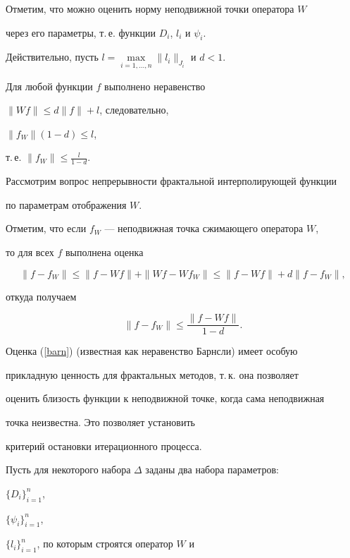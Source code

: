 Отметим, что можно оценить норму неподвижной точки оператора $W$


через его параметры, т.\,е. функции $D_i$, $l_i$ и $\psi_i$.


Действительно, пусть $l=\max\limits_{i=1,\dotsc,n}


\|l_i\|_{J_i}$ и $d<1$.


Для любой функции $f$ выполнено неравенство


$\| W f \| \le d \| f \| + l$, следовательно,


$\|f_W\|(1-d) \le l$,


т.\,е. $\|f_W\| \le \frac{l}{1-d}$.





Рассмотрим вопрос непрерывности фрактальной интерполирующей функции


по параметрам отображения $W$.


Отметим, что если $f_W$ --- неподвижная точка сжимающего оператора $W$,


то для всех $f$ выполнена оценка


$$


\|f -f_{W}\| \le \|f -W f\| +\| W f - W f_{W}\| \le


\|f - W f \| + d \|f - f_{W}\| ,


$$


откуда получаем


\begin{equation} \label{barn}


\|f -f_{W}\| \le \frac{\|f - W f \|}{1- d}.


\end{equation}


Оценка (\ref{barn}) (известная как неравенство Барнсли) имеет особую


прикладную ценность для фрактальных методов, т.\,к. она позволяет


оценить близость функции к неподвижной точке, когда сама неподвижная


точка неизвестна. Это позволяет установить


критерий остановки итерационного процесса.





Пусть для некоторого набора $ \Delta $ заданы два набора параметров:


$\{D_i\}_{i=1}^n$,


$\{\psi_i\}_{i=1}^n$,


$\{l_i\}_{i=1}^n$, по которым строятся оператор $W$ и


